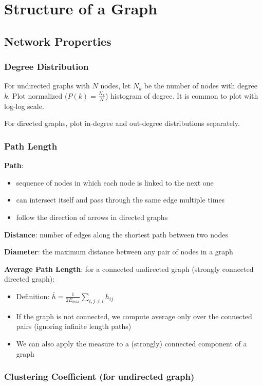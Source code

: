 \section{Structure of a Graph}\label{s_2}
\subsection{Network Properties}\label{ss_21_network_properties}
\subsubsection{Degree Distribution}
For undirected graphs with $N$ nodes, let $N_k$ be the number of nodes with degree $k$. Plot normalized ($P(k) = \frac{N_k}{N}$) histogram of degree. It is common to plot with log-log scale.

\noindent For directed graphs, plot in-degree and out-degree distributions separately.

\subsubsection{Path Length}

\textbf{Path}: 
\begin{itemize}
    \item sequence of nodes in which each
node is linked to the next one
    \item can intersect itself
and pass through the
same edge multiple times
    \item follow the direction of arrows in directed graphs
\end{itemize}

\noindent \textbf{Distance}: number of edges along the shortest path between two nodes

\noindent \textbf{Diameter}: the maximum distance between any pair of nodes in a graph

\noindent \textbf{Average Path Length}: 
for a connected undirected graph (strongly connected directed graph):
\begin{itemize}
    \item Definition: $\bar{h} =  \frac{1}{2E_{max}}\sum_{i, j \neq i} h_{ij}$
    \item If the graph is not connected, we compute average only over the connected pairs (ignoring infinite length paths)
    \item We can also apply the measure to a (strongly) connected component of a graph
\end{itemize}
\subsubsection{Clustering Coefficient (for undirected graph)}

